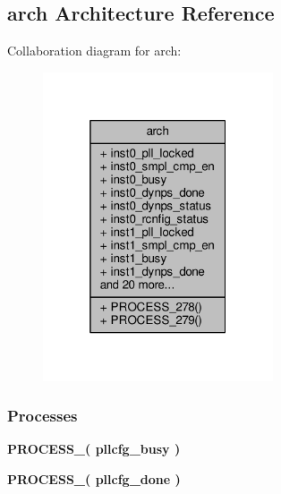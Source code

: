\subsection{arch Architecture Reference}
\label{classpll__top_1_1arch}


Collaboration diagram for arch\+:\nopagebreak
\begin{figure}[H]
\begin{center}
\leavevmode
\includegraphics[width=193pt]{d7/d91/classpll__top_1_1arch__coll__graph}
\end{center}
\end{figure}
\subsubsection*{Processes}
 \begin{DoxyCompactItemize}
\item 
{\bf P\+R\+O\+C\+E\+S\+S\+\_}{\bfseries  ( {\bfseries {\bfseries {\bf pllcfg\+\_\+busy}} \textcolor{vhdlchar}{ }} )}
\item 
{\bf P\+R\+O\+C\+E\+S\+S\+\_}{\bfseries  ( {\bfseries {\bfseries {\bf pllcfg\+\_\+done}} \textcolor{vhdlchar}{ }} )}
\end{DoxyCompactItemize}
